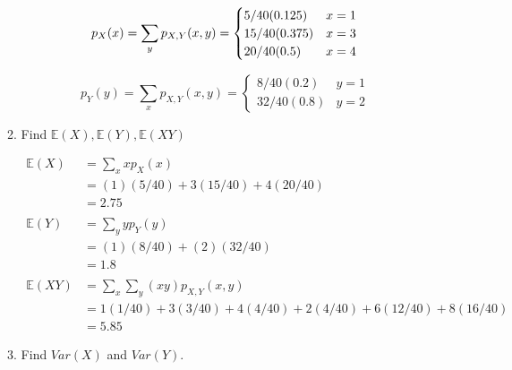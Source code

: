 \documentclass{article}
\begin{document}
\begin{enumerate}
\begin{enumerate}
    \[
      p_X(x) = \sum_{y} p_{X,Y}(x,y) =
      \begin{cases}
        5/40 (0.125) & x = 1 \\
        15/40 (0.375) & x = 3 \\
        20/40 (0.5) & x = 4
      \end{cases} \\
    \]
    
    \[
      p_Y(y) = \sum_{x} p_{X,Y} (x,y) =
      \begin{cases}
        8/40 (0.2) & y = 1 \\
        32/40 (0.8) & y = 2
      \end{cases}
    \]

  \item Find $\mathbb{E}(X), \mathbb{E}(Y), \mathbb{E}(XY)$

    \[
      \begin{aligned}
        \mathbb{E}(X)
        &= \sum_{x} x p_X(x) \\
        &= (1)(5/40) + 3(15/40) + 4(20/40) \\
        &= 2.75 \\
        \\
        \mathbb{E}(Y)
        &= \sum_{y} y p_Y(y) \\
        &= (1)(8/40) + (2)(32/40) \\
        &= 1.8 \\
        \\
        \mathbb{E}(XY)
        &= \sum_x \sum_y (xy) p_{X,Y}(x,y) \\
        &= 1(1/40) + 3(3/40) + 4(4/40) + 2(4/40) + 6(12/40) + 8(16/40) \\
        &= 5.85
      \end{aligned}
    \]
    
  \item Find $Var(X)$ and $Var(Y)$.
    
  \end{enumerate}
\end{enumerate}
\end{document}
